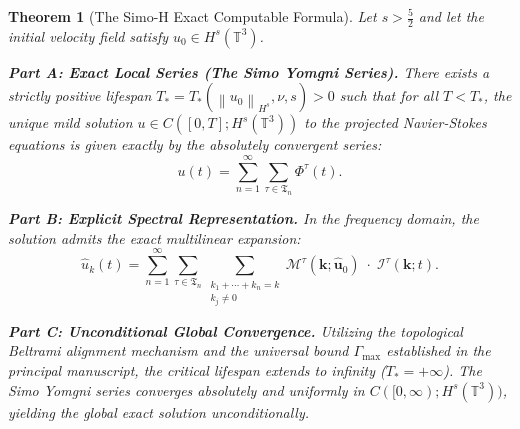 \documentclass[12pt,a4paper]{article}
\theoremstyle{plain}
\newtheorem{theorem}{Theorem}[section]
\theoremstyle{definition}
\theoremstyle{remark}
\newcommand{\Hs}{H^s}
\newcommand{\T}{\mathbb{T}}
\newcommand{\norm}[1]{\left\|#1\right\|}
\newcommand{\MM}{\mathcal{M}}
\newcommand{\II}{\mathcal{I}}
\newcommand{\fT}{\mathfrak{T}}
\begin{document}
\begin{theorem}[The Simo-H Exact Computable Formula]
\label{thm:main_exact_formula}
Let $s > \frac{5}{2}$ and let the initial velocity field satisfy $u_0 \in \Hs(\T^3)$. 

\noindent\textbf{Part A: Exact Local Series (The Simo Yomgni Series).}
There exists a strictly positive lifespan $T_* = T_*(\norm{u_0}_{H^s}, \nu, s) > 0$ such that for all $T < T_*$, the unique mild solution $u \in C([0,T]; \Hs(\T^3))$ to the projected Navier-Stokes equations is given exactly by the absolutely convergent series:
\[
  u(t) = \sum_{n=1}^{\infty} \sum_{\tau\in\fT_n} \Phi^\tau(t).
  \tag{F}
\]

\noindent\textbf{Part B: Explicit Spectral Representation.}
In the frequency domain, the solution admits the exact multilinear expansion:
\[
  \hat{u}_k(t) = \sum_{n=1}^\infty \sum_{\tau\in\fT_n} \sum_{\substack{k_1+\cdots+k_n=k\\k_j\neq 0}} \MM^\tau(\mathbf{k};\hat{\mathbf{u}}_0) \;\cdot\; \II^\tau(\mathbf{k};t).
  \tag{EF}
\]

\noindent\textbf{Part C: Unconditional Global Convergence.}
Utilizing the topological Beltrami alignment mechanism and the universal bound $\Gamma_{\max}$ established in the principal manuscript, the critical lifespan extends to infinity ($T_* = +\infty$). The Simo Yomgni series converges absolutely and uniformly in $C([0,\infty); \Hs(\T^3))$, yielding the global exact solution unconditionally.
\end{theorem}
\end{document}
